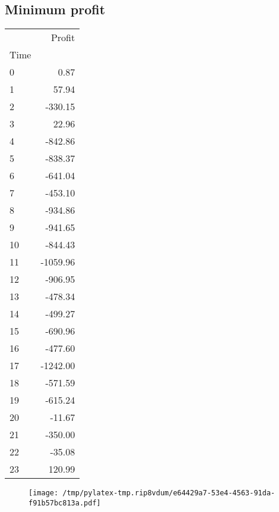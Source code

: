 \documentclass{article}%
\begin{document}
\subsection{Minimum profit }%
\label{subsec:Minimumprofit}%
\begin{tabular}{lr}
\toprule
{} &   Profit \\
Time &          \\
\midrule
0    &     0.87 \\
1    &    57.94 \\
2    &  -330.15 \\
3    &    22.96 \\
4    &  -842.86 \\
5    &  -838.37 \\
6    &  -641.04 \\
7    &  -453.10 \\
8    &  -934.86 \\
9    &  -941.65 \\
10   &  -844.43 \\
11   & -1059.96 \\
12   &  -906.95 \\
13   &  -478.34 \\
14   &  -499.27 \\
15   &  -690.96 \\
16   &  -477.60 \\
17   & -1242.00 \\
18   &  -571.59 \\
19   &  -615.24 \\
20   &   -11.67 \\
21   &  -350.00 \\
22   &   -35.08 \\
23   &   120.99 \\
\bottomrule
\end{tabular}
%


\begin{figure}[htbp]%
\centering%
\texttt{[image: /tmp/pylatex-tmp.rip8vdum/e64429a7-53e4-4563-91da-f91b57bc813a.pdf]}%
\end{figure}

%
\newpage %
\end{document}
